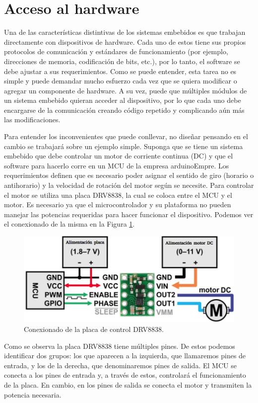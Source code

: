 \minitoc



\section{Acceso al hardware}
\label{Accesoalhardware}
Una de las características distintivas de los sistemas embebidos es que trabajan directamente con dispositivos de hardware. Cada uno de estos tiene sus propios protocolos de comunicación y estándares de funcionamiento (por ejemplo, direcciones de memoria, codificación de bits, etc.), por lo tanto, el software se debe ajustar a sus requerimientos. Como se puede entender, esta tarea no es simple y puede demandar mucho esfuerzo cada vez que se quiera modificar o agregar un componente de hardware. A su vez, puede que múltiples módulos de un sistema embebido quieran acceder al dispositivo, por lo que cada uno debe encargarse de la comunicación creando código repetido y complicando aún más las modificaciones. 

Para entender los inconvenientes que puede conllevar, no diseñar pensando en el cambio se trabajará sobre un ejemplo simple. Suponga que se tiene un sistema embebido que debe controlar un motor de corriente continua (\gls{DC}) y que el software para hacerlo corre en un \gls{MCU} de la empresa \gls{arduinoEmpre}. Los requerimientos definen que es necesario poder asignar el sentido de giro (horario o antihorario) y la velocidad de rotación del motor según se necesite. Para controlar el motor se utiliza una placa \gls{DRV8838}, la cual se coloca entre el \gls{MCU} y el motor. Es necesario ya que el microcontrolador y su plataforma no pueden manejar las potencias requeridas para hacer funcionar el dispositivo. Podemos ver el conexionado de la misma en la Figura \ref{drv8838}.

\begin{figure}[h]
    \centering
    \includegraphics[width=0.65\linewidth]{drv8838.png}
    \caption{Conexionado de la placa de control DRV8838.}
    \label{drv8838}
\end{figure}

Como se observa la placa \gls{DRV8838} tiene múltiples pines. De estos podemos identificar dos grupos: los que aparecen a la izquierda, que llamaremos pines de entrada, y los de la derecha, que denominaremos pines de salida. El \gls{MCU} se conecta a los pines de entrada y, a través de estos, controlará el funcionamiento de la placa. En cambio, en los pines de salida se conecta el motor y transmiten la potencia necesaria.

